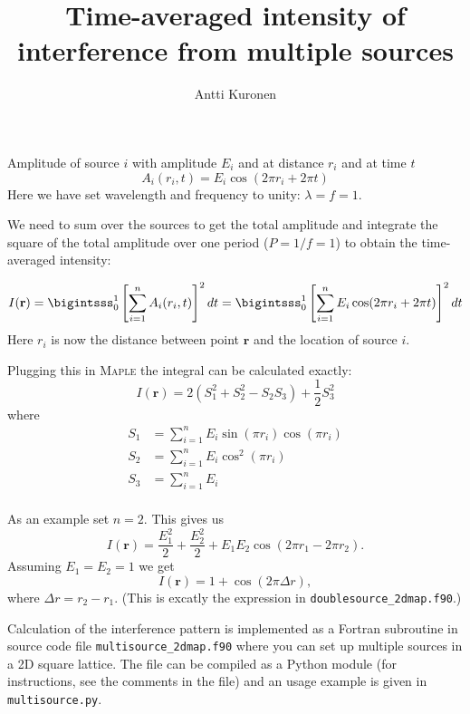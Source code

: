 \documentclass[fleqn,10pt]{olplainarticle}
\title{Time-averaged intensity of interference from multiple sources}
\author[1]{Antti Kuronen}
\affil[1]{Department of Physics, University of Helsinki, Pietari Kalmin katu 2, Helsinki 00014, Finland}
\begin{document}
\flushbottom
\maketitle
\thispagestyle{empty}


Amplitude of source $i$ with amplitude $E_i$ and at distance $r_i$ and at time $t$
\begin{equation}
A_i(r_i,t) = E_i \cos(2\pi r_i + 2\pi t)
\end{equation}
Here we have set wavelength and frequency to unity: $\lambda=f=1$.

We need to sum over the sources to get the total amplitude and integrate the square of the total amplitude over one period ($P=1/f=1$) to obtain the time-averaged intensity:

\begin{equation}
I(\mathbf{r}) = \bigintsss_0^1 \left[ \sum_{i=1}^n A_i(r_i,t) \right] ^2 dt = 
\bigintsss_0^1 \left[ \sum_{i=1}^n E_i \cos(2\pi r_i + 2\pi t) \right] ^2 dt 
\end{equation}
Here $r_i$ is now the distance between point $\mathbf{r}$ and the location of source $i$.

Plugging this in \textsc{Maple} the integral can be calculated exactly:
\begin{equation}
I(\mathbf{r}) = 2 (S_1^2 + S_2^2 - S_2 S_3) + \frac{1}{2} S_3^2 
\end{equation}
where
\begin{align}
S_1  & =  \sum_{i=1}^n E_i \sin(\pi r_i)\cos(\pi r_i) \\
S_2  & =  \sum_{i=1}^n E_i\cos^2(\pi r_i) \\
S_3  & =  \sum_{i=1}^n E_i \\
\end{align}

As an example set $n=2$. This gives us 
\begin{equation}
I(\mathbf{r}) = \frac{E_1^2}{2} + \frac{E_2^2}{2} + E_1 E_2 \cos(2\pi r_1 - 2\pi r_2).
\end{equation}
Assuming $E_1=E_2=1$ we get
\begin{equation}
I(\mathbf{r}) = 1 + \cos(2\pi \Delta r),
\end{equation}
where $\Delta r = r_2-r_1$. (This is excatly the expression in \texttt{doublesource\_2dmap.f90}.)

Calculation of the interference pattern is implemented as a Fortran subroutine in source code file \texttt{multisource\_2dmap.f90} where you can set up multiple sources in a 2D square lattice. The file can be compiled as a Python module (for instructions, see the comments in the file) and an usage example is given in \texttt{multisource.py}.

\printbibliography
\end{document}

